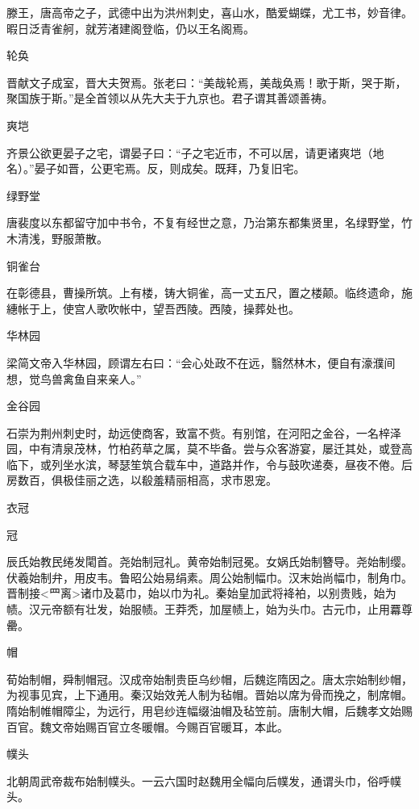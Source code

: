 \documentclass[a4paper,12pt,UTF8,twoside]{ctexbook}
\begin{document}
    滕王，唐高帝之子，武德中出为洪州刺史，喜山水，酷爱蝴蝶，尤工书，妙音律。暇日泛青雀舸，就芳渚建阁登临，仍以王名阁焉。
    
    轮奂
    
    晋献文子成室，晋大夫贺焉。张老曰：“美哉轮焉，美哉奂焉！歌于斯，哭于斯，聚国族于斯。”是全首领以从先大夫于九京也。君子谓其善颂善祷。
    
    爽垲
    
    齐景公欲更晏子之宅，谓晏子曰：“子之宅近市，不可以居，请更诸爽垲（地名）。”晏子如晋，公更宅焉。反，则成矣。既拜，乃复旧宅。
    
    绿野堂
    
    唐裴度以东都留守加中书令，不复有经世之意，乃治第东都集贤里，名绿野堂，竹木清浅，野服萧散。
    
    铜雀台
    
    在彰德县，曹操所筑。上有楼，铸大铜雀，高一丈五尺，置之楼颠。临终遗命，施繐帐于上，使宫人歌吹帐中，望吾西陵。西陵，操葬处也。
    
    华林园
    
    梁简文帝入华林园，顾谓左右曰：“会心处政不在远，翳然林木，便自有濠濮间想，觉鸟兽禽鱼自来亲人。”
    
    金谷园
    
    石崇为荆州刺史时，劫远使商客，致富不赀。有别馆，在河阳之金谷，一名梓泽园，中有清泉茂林，竹柏药草之属，莫不毕备。尝与众客游宴，屡迁其处，或登高临下，或列坐水滨，琴瑟笙筑合载车中，道路并作，令与鼓吹递奏，昼夜不倦。后房数百，俱极佳丽之选，以殽羞精丽相高，求市恩宠。
    
    衣冠
    
    冠
    
    辰氏始教民绻发閐首。尧始制冠礼。黄帝始制冠冕。女娲氏始制簪导。尧始制缨。伏羲始制弁，用皮韦。鲁昭公始易绢素。周公始制幅巾。汉末始尚幅巾，制角巾。晋制接<罒离>诸巾及葛巾，始以巾为礼。秦始皇加武将袶袙，以别贵贱，始为帻。汉元帝额有壮发，始服帻。王莽秃，加屋帻上，始为头巾。古元巾，止用羃尊罍。
    
    帽
    
    荀始制帽，舜制帽冠。汉成帝始制贵臣乌纱帽，后魏迄隋因之。唐太宗始制纱帽，为视事见宾，上下通用。秦汉始效羌人制为毡帽。晋始以席为骨而挽之，制席帽。隋始制帷帽障尘，为远行，用皂纱连幅缀油帽及毡笠前。唐制大帽，后魏孝文始赐百官。魏文帝始赐百官立冬暖帽。今赐百官暖耳，本此。
    
    幞头
    
    北朝周武帝裁布始制幞头。一云六国时赵魏用全幅向后幞发，通谓头巾，俗呼幞头。
    
\end{document}

